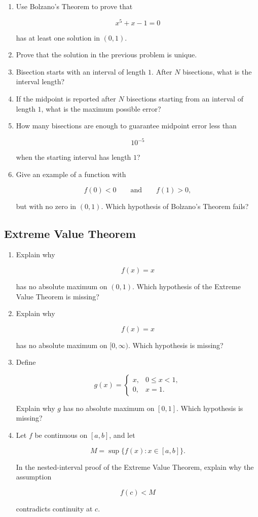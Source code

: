 \begin{enumerate}
\item Use Bolzano's Theorem to prove that

\[
x^5+x-1=0
\]

has at least one solution in \((0,1)\).

\item Prove that the solution in the previous problem is unique.

\item Bisection starts with an interval of length \(1\).  After \(N\) bisections, what is
the interval length?

\item If the midpoint is reported after \(N\) bisections starting from an interval of
length \(1\), what is the maximum possible error?

\item How many bisections are enough to guarantee midpoint error less than

\[
10^{-5}
\]

when the starting interval has length \(1\)?

\item Give an example of a function with

\[
f(0)<0
\qquad\text{and}\qquad
f(1)>0,
\]

but with no zero in \((0,1)\).  Which hypothesis of Bolzano's Theorem fails?
\end{enumerate}

\subsection*{Extreme Value Theorem}

\begin{enumerate}
\item Explain why

\[
f(x)=x
\]

has no absolute maximum on \((0,1)\).  Which hypothesis of the Extreme Value Theorem
is missing?

\item Explain why

\[
f(x)=x
\]

has no absolute maximum on \([0,\infty)\).  Which hypothesis is missing?

\item Define

\[
g(x)=
\begin{cases}
x, & 0\le x<1,\\
0, & x=1.
\end{cases}
\]

Explain why \(g\) has no absolute maximum on \([0,1]\).  Which hypothesis is missing?

\item Let \(f\) be continuous on \([a,b]\), and let

\[
M=\sup\{f(x):x\in[a,b]\}.
\]

In the nested-interval proof of the Extreme Value Theorem, explain why the assumption

\[
f(c)<M
\]

contradicts continuity at \(c\).
\end{enumerate}


